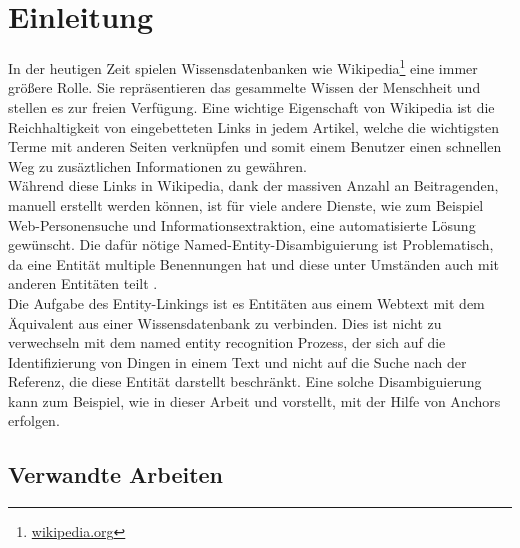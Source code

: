 \documentclass[11pt, a4paper, oneside]{Thesis} %
\begin{document}
\pagestyle{fancy} %

\chapter{Einleitung}
\label{Kapitel 1}

In der heutigen Zeit spielen Wissensdatenbanken wie Wikipedia\footnote{\url{wikipedia.org}} eine immer gr\"o\ss ere Rolle. Sie repr\"asentieren das gesammelte Wissen der Menschheit und stellen es zur freien Verf\"ugung. Eine wichtige Eigenschaft von Wikipedia ist die Reichhaltigkeit von eingebetteten Links in jedem Artikel, welche die wichtigsten Terme mit anderen Seiten verknüpfen und somit einem Benutzer einen schnellen Weg zu zus\"aztlichen Informationen zu gew\"ahren\citep{rada07}.\\
W\"ahrend diese Links in Wikipedia, dank der massiven Anzahl an Beitragenden, manuell erstellt werden k\"onnen, ist f\"ur viele andere Dienste, wie zum Beispiel Web-Personensuche und Informationsextraktion, eine automatisierte L\"osung gew\"unscht. Die daf\"ur n\"otige Named-Entity-Disambiguierung ist Problematisch, da eine Entit\"at multiple Benennungen hat und diese unter Umst\"anden auch mit anderen Entit\"aten teilt \cite{wei10}.\\
Die Aufgabe des Entity-Linkings ist es Entit\"aten aus einem Webtext mit dem \"Aquivalent aus einer Wissensdatenbank zu verbinden. Dies ist nicht zu verwechseln mit dem named entity recognition Prozess, der sich auf die Identifizierung von Dingen in einem Text und nicht auf die Suche nach der Referenz, die diese Entit\"at darstellt beschr\"ankt. Eine solche Disambiguierung kann zum Beispiel, wie in dieser Arbeit und \citep{mil08} vorstellt, mit der Hilfe von Anchors erfolgen.
\section{Verwandte Arbeiten}
\end{document}
